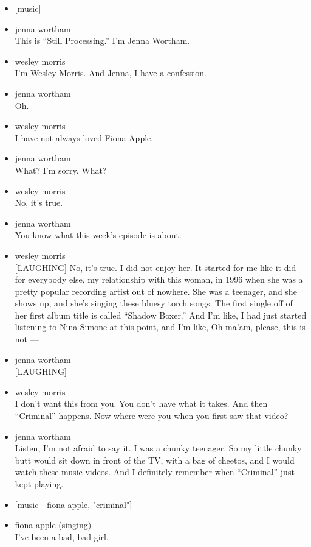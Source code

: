 \begin{itemize}
\item
  {[}music{]}
\item
  jenna wortham\\
  This is ``Still Processing.'' I'm Jenna Wortham.
\item
  wesley morris\\
  I'm Wesley Morris. And Jenna, I have a confession.
\item
  jenna wortham\\
  Oh.
\item
  wesley morris\\
  I have not always loved Fiona Apple.
\item
  jenna wortham\\
  What? I'm sorry. What?
\item
  wesley morris\\
  No, it's true.
\item
  jenna wortham\\
  You know what this week's episode is about.
\item
  wesley morris\\
  {[}LAUGHING{]} No, it's true. I did not enjoy her. It started for me
  like it did for everybody else, my relationship with this woman, in
  1996 when she was a pretty popular recording artist out of nowhere.
  She was a teenager, and she shows up, and she's singing these bluesy
  torch songs. The first single off of her first album title is called
  ``Shadow Boxer.'' And I'm like, I had just started listening to Nina
  Simone at this point, and I'm like, Oh ma'am, please, this is not ---
\item
  jenna wortham\\
  {[}LAUGHING{]}
\item
  wesley morris\\
  I don't want this from you. You don't have what it takes. And then
  ``Criminal'' happens. Now where were you when you first saw that
  video?
\item
  jenna wortham\\
  Listen, I'm not afraid to say it. I was a chunky teenager. So my
  little chunky butt would sit down in front of the TV, with a bag of
  cheetos, and I would watch these music videos. And I definitely
  remember when ``Criminal'' just kept playing.
\item
  {[}music - fiona apple, "criminal"{]}
\item
  fiona apple (singing)\\
  I've been a bad, bad girl.
\end{itemize}


